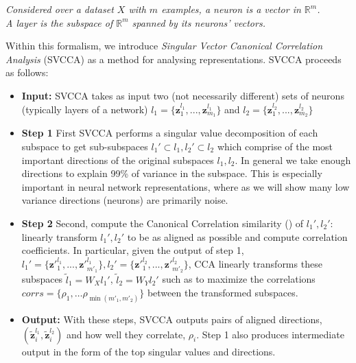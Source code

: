 \documentclass{article} %
\begin{document}
\begin{center}
  \textit{Considered over a dataset $X$ with $m$ examples, a neuron is a vector in $\mathbb{R}^m$. \\
    A layer is the subspace of
    $\mathbb{R}^m$ spanned by its neurons' vectors.}
\end{center}


Within this formalism, we introduce \textit{Singular Vector Canonical Correlation Analysis} (SVCCA) as a method for analysing representations. SVCCA proceeds as follows:
\begin{itemize}
\item \textbf{Input:} SVCCA takes as input two (not necessarily different) sets of neurons (typically layers of a network) $l_1 = \{ \pmb{z}^{l_1}_1,..., \pmb{z}^{l_1}_{m_1} \}$ and $  l_2 = \{  \pmb{z}^{l_2}_1,..., \pmb{z}^{l_2}_{m_2} \}$
\item \textbf{Step 1} First SVCCA performs a singular value decomposition of each subspace to get sub-subspaces $l_1' \subset l_1, l_2' \subset l_2 $ which comprise of the most important directions of the original subspaces $l_1, l_2$. In general we  take enough directions to explain 99\% of variance in the subspace. This is especially important in neural network representations, where as we will show many low variance directions (neurons) are primarily noise.
\item \textbf{Step 2} Second, compute the Canonical Correlation similarity (\cite{ccapaper}) of $l_1', l_2'$: linearly transform $l_1', l_2'$ to be as aligned as possible and compute correlation coefficients. In particular, given the output of step 1, $l_1' = \{ {\pmb{z}'}^{l_1}_1,..., {\pmb{z}'}^{l_1}_{m'_1} \}, l_2' = \{ {\pmb{z}'}^{l_2}_1,..., {\pmb{z}'}^{l_2}_{m'_2} \}$, CCA linearly transforms these subspaces $\tilde{l}_1= W_X l_1'$, $\tilde{l}_2 = W_Y l_2'$ such as to maximize the correlations $corrs = \{\rho_1, \dots \rho_{\min(m'_1, m'_2)} \}$ between the transformed subspaces.
\item \textbf{Output:} With these steps, SVCCA outputs pairs of aligned directions, $(\tilde{\pmb{z}}^{l_1}_i, \tilde{\pmb{z}}^{l_2}_i)$ and how well they correlate, $\rho_i$. Step 1 also produces intermediate output in the form of the top singular values and directions.
\end{itemize}
\end{document}
